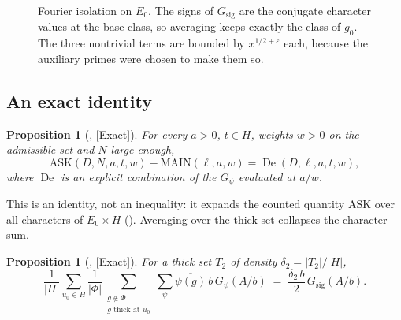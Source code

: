 \documentclass[11pt]{article}
\newcommand{\Exact}{\textcolor{exactc}{\textsf{\small[Exact]}}}
\newcommand{\eps}{\varepsilon}
\newcommand{\ASK}{\mathrm{ASK}}
\newcommand{\MAIN}{\mathrm{MAIN}}
\newcommand{\Gz}{G_\zeta}
\newcommand{\Gsig}{G_{\mathrm{sig}}}
\theoremstyle{plain}
\newtheorem{proposition}[theorem]{Proposition}
\theoremstyle{definition}
\begin{document}
\begin{figure}[ht]
\centering
{}
\caption{Fourier isolation on $E_0$. The signs of $\Gsig$ are the conjugate character values at
the base class, so averaging keeps exactly the class of $g_0$. The three nontrivial terms are
bounded by $x^{1/2+\eps}$ each, because the auxiliary primes were chosen to make them so.}\label{fig:signs}
\end{figure}



\subsection{An exact identity}

\begin{proposition}[, \Exact]\label{prop:chbalance}
For every $a>0$, $t\in H$, weights $w>0$ on the admissible set and $N$ large enough,
\[
\ASK(D,N,a,t,w) - \MAIN(\ell,a,w) = \operatorname{De}(D,\ell,a,t,w),
\]
where $\operatorname{De}$ is an explicit combination of the $G_\psi$ evaluated at $a/w$.
\end{proposition}

This is an identity, not an inequality: it expands the counted quantity $\ASK$ over all characters
of $E_0\times H$ (). Averaging over the thick set collapses the character sum.

\begin{proposition}[, \Exact]
For a thick set $T_2$ of density $\delta_2 = |T_2|/|H|$,
\[
\frac{1}{|H|}\sum_{u_0\in H}\frac{1}{|\Phi|}\sum_{\substack{g\notin\Phi\\ g \text{ thick at } u_0}}
\sum_{\psi}\overline{\psi(g)}\, b\,G_\psi(A/b) \;=\; \frac{\delta_2\, b}{2}\,\Gsig(A/b).
\]
\end{proposition}
\end{document}
